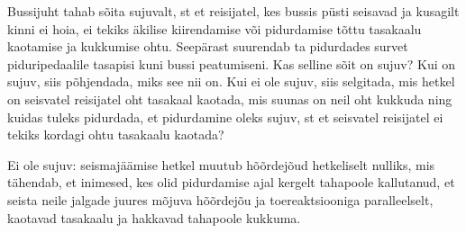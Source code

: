 
Bussijuht tahab sõita sujuvalt, st et reisijatel, kes bussis püsti seisavad ja kusagilt kinni ei hoia, ei tekiks äkilise kiirendamise või pidurdamise tõttu tasakaalu kaotamise ja kukkumise ohtu. Seepärast suurendab ta pidurdades survet piduripedaalile tasapisi kuni bussi peatumiseni. Kas selline sõit on sujuv? Kui on sujuv, siis põhjendada, miks see nii on. Kui ei ole sujuv, siis selgitada, mis hetkel on seisvatel reisijatel oht tasakaal kaotada, mis suunas on neil oht kukkuda ning kuidas tuleks pidurdada, et pidurdamine oleks sujuv, st et seisvatel reisijatel ei tekiks kordagi ohtu tasakaalu kaotada?


\hint

\solu
\par
Ei ole sujuv: seismajäämise hetkel muutub hõõrdejõud hetkeliselt nulliks, mis tähendab, et inimesed, kes olid pidurdamise ajal kergelt tahapoole kallutanud, et seista neile jalgade juures mõjuva hõõrdejõu ja toereaktsiooniga paralleelselt, kaotavad tasakaalu ja hakkavad tahapoole kukkuma.
\probend